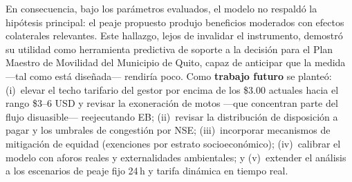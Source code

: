 \documentclass[twocolumn,10pt]{article}
\begin{document}
En consecuencia, bajo los par\'ametros evaluados, el modelo no respald\'o la hip\'otesis
principal: el peaje propuesto produjo beneficios moderados con efectos colaterales
relevantes. Este hallazgo, lejos de invalidar el instrumento, demostr\'o su utilidad como
herramienta predictiva de soporte a la decisi\'on para el Plan Maestro de Movilidad del
Municipio de Quito, capaz de anticipar que la medida ---tal como est\'a dise\~nada---
rendir\'ia poco. Como \textbf{trabajo futuro} se plante\'o: (i)~elevar el techo tarifario
del gestor por encima de los \$3.00 actuales hacia el rango \$3--6 USD y revisar la
exoneraci\'on de motos ---que concentran parte del flujo disuasible--- reejecutando EB;
(ii)~revisar la distribuci\'on de disposici\'on a pagar y los umbrales de congesti\'on por
NSE; (iii)~incorporar mecanismos de mitigaci\'on de equidad (exenciones por estrato
socioecon\'omico); (iv)~calibrar el modelo con aforos reales y externalidades ambientales;
y (v)~extender el an\'alisis a los escenarios de peaje fijo 24\,h y tarifa din\'amica en
tiempo real.


\small

\end{document}
